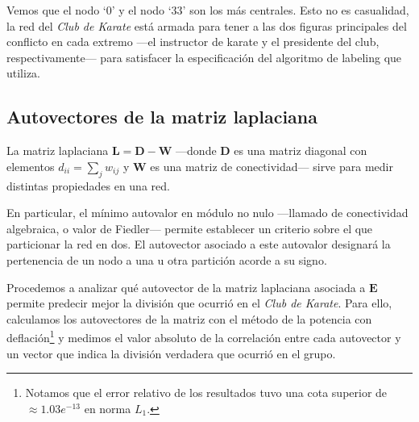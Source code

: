 \vspace{1em}
Vemos que el nodo `0' y el nodo `33' son los más centrales. Esto no es casualidad, la red del \textit{Club de Karate} está armada para tener a las dos figuras principales del conflicto en cada extremo ---el instructor de karate y el presidente del club, respectivamente--- para satisfacer la especificación del algoritmo de labeling que utiliza.





\vspace{2em}
\subsection{Autovectores de la matriz laplaciana} La matriz laplaciana $\mathbf{L} = \mathbf{D} - \mathbf{W}$ ---donde \textbf{D} es una matriz diagonal con elementos $d_{ii} = \sum_j w_{ij}$ y \textbf{W} es una matriz de conectividad--- sirve para medir distintas propiedades en una red. 

En particular, el mínimo autovalor en módulo no nulo ---llamado de conectividad algebraica, o valor de Fiedler--- permite establecer un criterio sobre el que particionar la red en dos. El autovector asociado a este autovalor designará la pertenencia de un nodo a una u otra partición acorde a su signo. 

\vspace{1em}
Procedemos a analizar qué autovector de la matriz laplaciana asociada a $\mathbf{E}$ permite predecir mejor la división que ocurrió en el \textit{Club de Karate}. Para ello, calculamos los autovectores de la matriz con el método de la potencia con deflación\footnote{Notamos que el error relativo de los resultados tuvo una cota superior de $\approx 1.03e^{-13}$ en norma $L_1$.} y medimos el valor absoluto de la correlación entre cada autovector y un vector que indica la división verdadera que ocurrió en el grupo.


